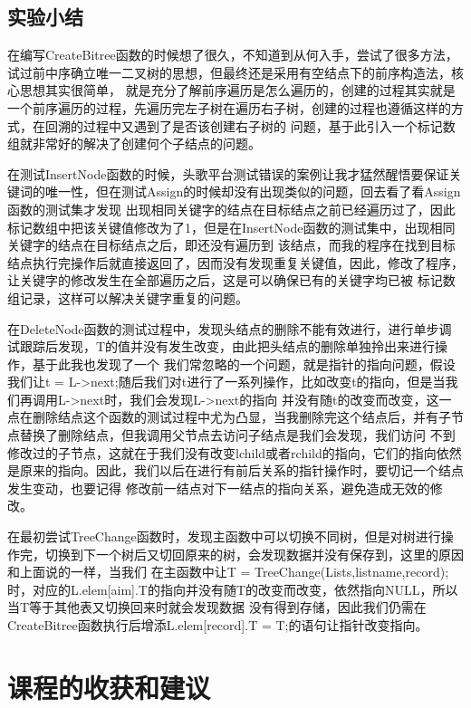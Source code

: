 \documentclass[supercite]{Experimental_Report}
\theoremstyle{definition}
\begin{document}
\subsection{实验小结}
在编写CreateBitree函数的时候想了很久，不知道到从何入手，尝试了很多方法，试过前中序确立唯一二叉树的思想，但最终还是采用有空结点下的前序构造法，核心思想其实很简单，
就是充分了解前序遍历是怎么遍历的，创建的过程其实就是一个前序遍历的过程，先遍历完左子树在遍历右子树，创建的过程也遵循这样的方式，在回溯的过程中又遇到了是否该创建右子树的
问题，基于此引入一个标记数组就非常好的解决了创建何个子结点的问题。

在测试InsertNode函数的时候，头歌平台测试错误的案例让我才猛然醒悟要保证关键词的唯一性，但在测试Assign的时候却没有出现类似的问题，回去看了看Assign函数的测试集才发现
出现相同关键字的结点在目标结点之前已经遍历过了，因此标记数组中把该关键值修改为了1，但是在InsertNode函数的测试集中，出现相同关键字的结点在目标结点之后，即还没有遍历到
该结点，而我的程序在找到目标结点执行完操作后就直接返回了，因而没有发现重复关键值，因此，修改了程序，让关键字的修改发生在全部遍历之后，这是可以确保已有的关键字均已被
标记数组记录，这样可以解决关键字重复的问题。

在DeleteNode函数的测试过程中，发现头结点的删除不能有效进行，进行单步调试跟踪后发现，T的值并没有发生改变，由此把头结点的删除单独拎出来进行操作，基于此我也发现了一个
我们常忽略的一个问题，就是指针的指向问题，假设我们让t = L->next;随后我们对t进行了一系列操作，比如改变t的指向，但是当我们再调用L->next时，我们会发现L->next的指向
并没有随t的改变而改变，这一点在删除结点这个函数的测试过程中尤为凸显，当我删除完这个结点后，并有子节点替换了删除结点，但我调用父节点去访问子结点是我们会发现，我们访问
不到修改过的子节点，这就在于我们没有改变lchild或者rchild的指向，它们的指向依然是原来的指向。因此，我们以后在进行有前后关系的指针操作时，要切记一个结点发生变动，也要记得
修改前一结点对下一结点的指向关系，避免造成无效的修改。

在最初尝试TreeChange函数时，发现主函数中可以切换不同树，但是对树进行操作完，切换到下一个树后又切回原来的树，会发现数据并没有保存到，这里的原因和上面说的一样，当我们
在主函数中让T = TreeChange(Lists,listname,record);时，对应的L.elem[aim].T的指向并没有随T的改变而改变，依然指向NULL，所以当T等于其他表又切换回来时就会发现数据
没有得到存储，因此我们仍需在CreateBitree函数执行后增添L.elem[record].T = T;的语句让指针改变指向。

\newpage


\section{课程的收获和建议}
\end{document}
